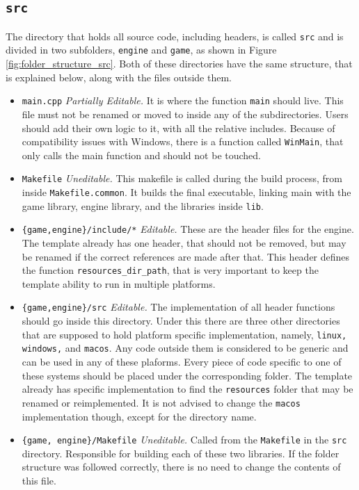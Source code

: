 \subsection{\texttt{src}}
\label{sec:src_folder}

The directory that holds all source code, including headers, is called \texttt{src} and is divided in two subfolders, \texttt{engine} and \texttt{game}, as shown in Figure \ref{fig:folder_structure_src}. Both of these directories have the same structure, that is explained below, along with the files outside them.

\begin{itemize}
	\item \texttt{main.cpp} \textit{Partially Editable.} It is where the function \texttt{main} should live. This file must not be renamed or moved to inside any of the subdirectories. Users should add their own logic to it, with all the relative includes. Because of compatibility issues with Windows, there is a function called \texttt{WinMain}, that only calls the main function and should not be touched.
	\item \texttt{Makefile} \textit{Uneditable.} This makefile is called during the build process, from inside \texttt{Makefile.common}. It builds the final executable, linking main with the game library, engine library, and the libraries inside \texttt{lib}.
	\item \texttt{\{game,engine\}/include/*} \textit{Editable.} These are the header files for the engine. The template already has one header, that should not be removed, but may be renamed if the correct references are made after that. This header defines the function \texttt{resources\_dir\_path}, that is very important to keep the template ability to run in multiple platforms.
	\item \texttt{\{game,engine\}/src} \textit{Editable.} The implementation of all header functions should go inside this directory. Under this there are three other directories that are supposed to hold platform specific implementation, namely, \texttt{linux, windows,} and \texttt{macos}. Any code outside them is considered to be generic and can be used in any of these plaforms. Every piece of code specific to one of these systems should be placed under the corresponding folder. The template already has specific implementation to find the \texttt{resources} folder that may be renamed or reimplemented. It is not advised to change the \texttt{macos} implementation though, except for the directory name.
	\item \texttt{\{game, engine\}/Makefile} \textit{Uneditable.} Called from the \texttt{Makefile} in the \texttt{src} directory. Responsible for building each of these two libraries. If the folder structure was followed correctly, there is no need to change the contents of this file.
\end{itemize}

